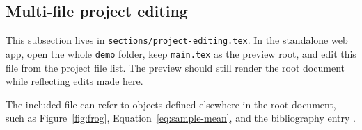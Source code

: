 \subsection{Multi-file project editing}

This subsection lives in \texttt{sections/project-editing.tex}. In the standalone web app, open the whole \texttt{demo} folder, keep \texttt{main.tex} as the preview root, and edit this file from the project file list. The preview should still render the root document while reflecting edits made here.

The included file can refer to objects defined elsewhere in the root document, such as Figure~\ref{fig:frog}, Equation~\eqref{eq:sample-mean}, and the bibliography entry \cite{greenwade93}.
